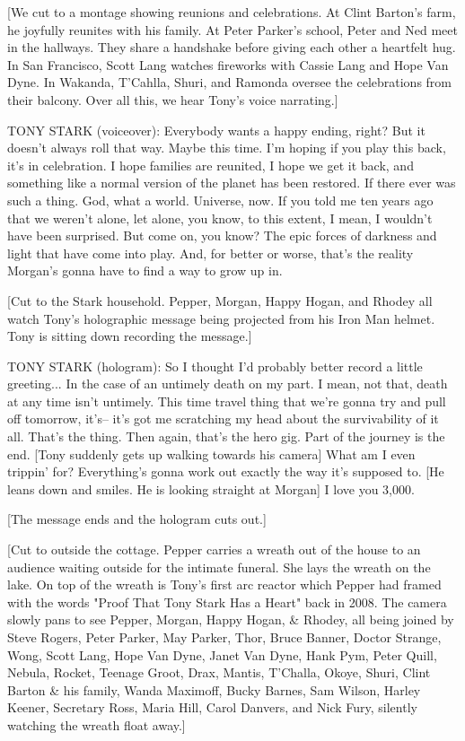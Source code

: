 [We cut to a montage showing reunions and celebrations. At Clint Barton's farm, he joyfully reunites with his family. At Peter Parker's school, Peter and Ned meet in the hallways. They share a handshake before giving each other a heartfelt hug. In San Francisco, Scott Lang watches fireworks with Cassie Lang and Hope Van Dyne. In Wakanda, T'Cahlla, Shuri, and Ramonda oversee the celebrations from their balcony. Over all this, we hear Tony's voice narrating.]

TONY STARK (voiceover): Everybody wants a happy ending, right? But it doesn't always roll that way. Maybe this time. I'm hoping if you play this back, it's in celebration. I hope families are reunited, I hope we get it back, and something like a normal version of the planet has been restored. If there ever was such a thing. God, what a world. Universe, now. If you told me ten years ago that we weren't alone, let alone, you know, to this extent, I mean, I wouldn't have been surprised. But come on, you know? The epic forces of darkness and light that have come into play. And, for better or worse, that's the reality Morgan's gonna have to find a way to grow up in.

[Cut to the Stark household. Pepper, Morgan, Happy Hogan, and Rhodey all watch Tony's holographic message being projected from his Iron Man helmet. Tony is sitting down recording the message.]

TONY STARK (hologram): So I thought I'd probably better record a little greeting... In the case of an untimely death on my part. I mean, not that, death at any time isn't untimely. This time travel thing that we're gonna try and pull off tomorrow, it's– it's got me scratching my head about the survivability of it all. That's the thing. Then again, that's the hero gig. Part of the journey is the end. [Tony suddenly gets up walking towards his camera] What am I even trippin' for? Everything's gonna work out exactly the way it's supposed to. [He leans down and smiles. He is looking straight at Morgan] I love you 3,000.

[The message ends and the hologram cuts out.]

[Cut to outside the cottage. Pepper carries a wreath out of the house to an audience waiting outside for the intimate funeral. She lays the wreath on the lake. On top of the wreath is Tony's first arc reactor which Pepper had framed with the words "Proof That Tony Stark Has a Heart" back in 2008. The camera slowly pans to see Pepper, Morgan, Happy Hogan, & Rhodey, all being joined by Steve Rogers, Peter Parker, May Parker, Thor, Bruce Banner, Doctor Strange, Wong, Scott Lang, Hope Van Dyne, Janet Van Dyne, Hank Pym, Peter Quill, Nebula, Rocket, Teenage Groot, Drax, Mantis, T'Challa, Okoye, Shuri, Clint Barton & his family, Wanda Maximoff, Bucky Barnes, Sam Wilson, Harley Keener, Secretary Ross, Maria Hill, Carol Danvers, and Nick Fury, silently watching the wreath float away.]

